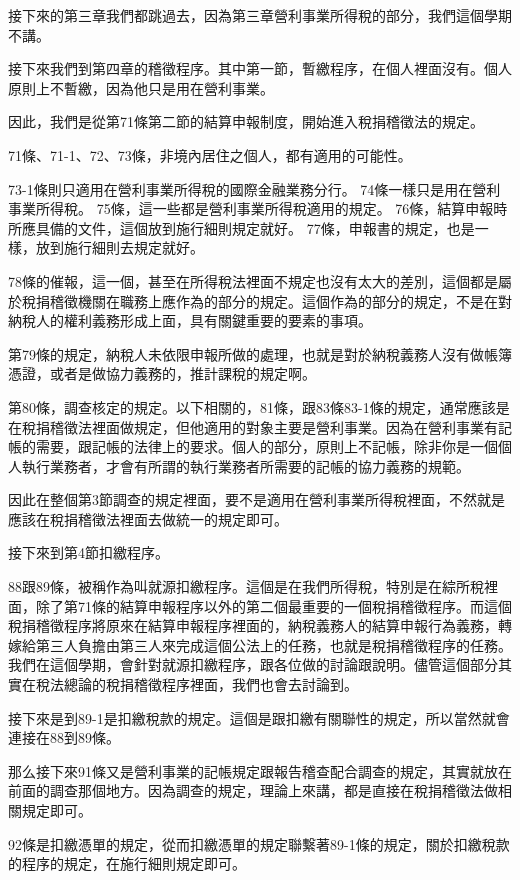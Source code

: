 \documentclass[]{ctexbook}
\begin{document}
接下來的第三章我們都跳過去，因為第三章營利事業所得稅的部分，我們這個學期不講。

接下來我們到第四章的稽徵程序。其中第一節，暫繳程序，在個人裡面沒有。個人原則上不暫繳，因為他只是用在營利事業。

因此，我們是從第71條第二節的結算申報制度，開始進入稅捐稽徵法的規定。

71條、71-1、72、73條，非境內居住之個人，都有適用的可能性。

73-1條則只適用在營利事業所得稅的國際金融業務分行。
74條一樣只是用在營利事業所得稅。
75條，這一些都是營利事業所得稅適用的規定。
76條，結算申報時所應具備的文件，這個放到施行細則規定就好。
77條，申報書的規定，也是一樣，放到施行細則去規定就好。

78條的催報，這一個，甚至在所得稅法裡面不規定也沒有太大的差別，這個都是屬於稅捐稽徵機關在職務上應作為的部分的規定。這個作為的部分的規定，不是在對納稅人的權利義務形成上面，具有關鍵重要的要素的事項。

第79條的規定，納稅人未依限申報所做的處理，也就是對於納稅義務人沒有做帳簿憑證，或者是做協力義務的，推計課稅的規定啊。

第80條，調查核定的規定。以下相關的，81條，跟83條83-1條的規定，通常應該是在稅捐稽徵法裡面做規定，但他適用的對象主要是營利事業。因為在營利事業有記帳的需要，跟記帳的法律上的要求。個人的部分，原則上不記帳，除非你是一個個人執行業務者，才會有所謂的執行業務者所需要的記帳的協力義務的規範。

因此在整個第3節調查的規定裡面，要不是適用在營利事業所得稅裡面，不然就是應該在稅捐稽徵法裡面去做統一的規定即可。

接下來到第4節扣繳程序。

88跟89條，被稱作為叫就源扣繳程序。這個是在我們所得稅，特別是在綜所稅裡面，除了第71條的結算申報程序以外的第二個最重要的一個稅捐稽徵程序。而這個稅捐稽徵程序將原來在結算申報程序裡面的，納稅義務人的結算申報行為義務，轉嫁給第三人負擔由第三人來完成這個公法上的任務，也就是稅捐稽徵程序的任務。
我們在這個學期，會針對就源扣繳程序，跟各位做的討論跟說明。儘管這個部分其實在稅法總論的稅捐稽徵程序裡面，我們也會去討論到。

接下來是到89-1是扣繳稅款的規定。這個是跟扣繳有關聯性的規定，所以當然就會連接在88到89條。

那么接下來91條又是營利事業的記帳規定跟報告稽查配合調查的規定，其實就放在前面的調查那個地方。因為調查的規定，理論上來講，都是直接在稅捐稽徵法做相關規定即可。

92條是扣繳憑單的規定，從而扣繳憑單的規定聯繫著89-1條的規定，關於扣繳稅款的程序的規定，在施行細則規定即可。
\end{document}
